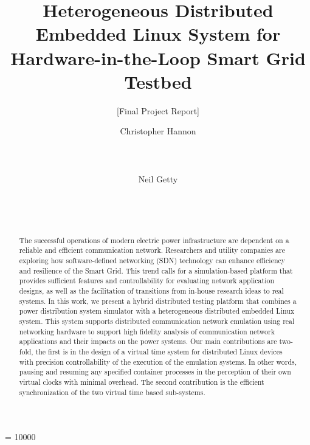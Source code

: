 \documentclass{sig-alternate-05-2015}
\begin{document}
\widowpenalty = 10000
\title{Heterogeneous Distributed Embedded Linux System for Hardware-in-the-Loop Smart Grid Testbed}
\subtitle{[Final Project Report]}



\author{
\alignauthor
Christopher Hannon\\
       \\
       \\
       \\
\alignauthor
Neil Getty\\
       \\
       \\
       \\
}


\maketitle

\begin{abstract}
The successful operations of modern electric power infrastructure are dependent on a reliable and efficient communication network. Researchers and utility companies are exploring how software-defined networking (SDN) technology can enhance efficiency and resilience of the Smart Grid. This trend calls for a simulation-based platform that provides sufficient features and controllability for evaluating network application designs, as well as the facilitation of transitions from in-house research ideas to real systems. In this work, we present a hybrid distributed testing platform that combines a power distribution system simulator with a heterogeneous distributed embedded Linux system. This system supports distributed communication network emulation using real networking hardware to support high fidelity analysis of communication network applications and their impacts on the power systems. Our main contributions are two-fold, the first is in the design of a virtual time system for distributed Linux devices with precision controllability of the execution of the emulation systems. In other words, pausing and resuming any specified container processes in the perception of their own virtual clocks with minimal overhead. The second contribution is the efficient synchronization of the two virtual time based sub-systems.
\end{abstract}
\end{document}
